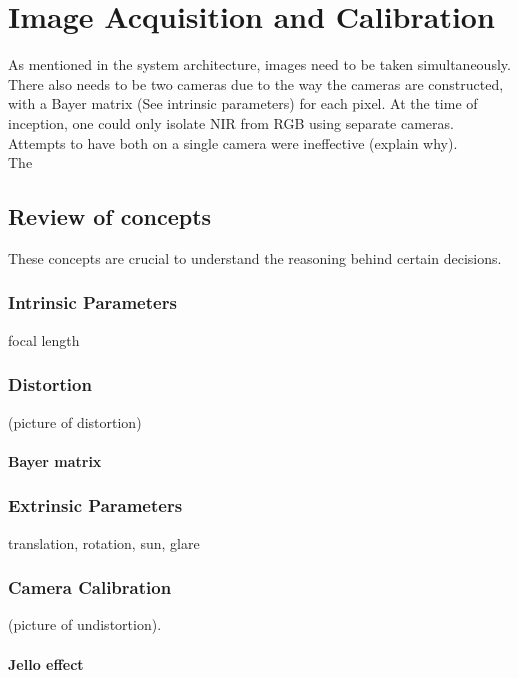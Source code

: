 \chapter{Image Acquisition and Calibration}

As mentioned in the system architecture, images need to be taken simultaneously. There also needs to be two cameras due to the way the cameras are constructed, with a Bayer matrix (See intrinsic parameters) for each pixel. At the time of inception, one could only isolate NIR from RGB using separate cameras. Attempts to have both on a single camera were ineffective (explain why).\\

\noindent
The

\section{Review of concepts}

These concepts are crucial to understand the reasoning behind certain decisions.

\subsection{Intrinsic Parameters}

focal length

\subsection{Distortion}

(picture of distortion)

\subsubsection{Bayer matrix}

\subsection{Extrinsic Parameters}

translation, rotation, sun, glare

\subsection{Camera Calibration}

(picture of undistortion).

\subsubsection{Jello effect}

